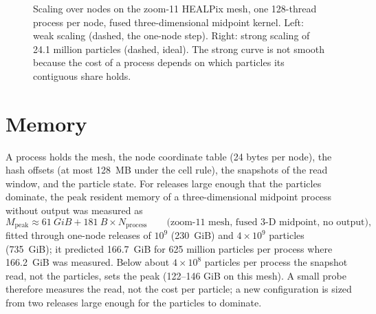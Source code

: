 \begin{figure}[t]
\centering
{}
\caption{Scaling over nodes on the zoom-11 HEALPix mesh, one 128-thread process per node, fused
three-dimensional midpoint kernel. Left: weak scaling (dashed, the one-node step). Right: strong
scaling of 24.1 million particles (dashed, ideal). The strong curve is not smooth because the cost of
a process depends on which particles its contiguous share holds.}
\label{fig:perf-nodes}
\end{figure}

\section{Memory}\label{sec:perf-memory}

A process holds the mesh, the node coordinate table (24 bytes per node), the hash offsets (at most
\SI{128}{MB} under the cell rule), the snapshots of the read window, and the particle state. For
releases large enough that the particles dominate, the peak resident memory of a
three-dimensional midpoint process without output was measured as
\begin{equation}\label{eq:perf-memory}
  M_{\text{peak}} \approx \SI{61}{GiB} + \SI{181}{B} \times N_{\text{process}}
  \qquad\text{(zoom-11 mesh, fused 3-D midpoint, no output)},
\end{equation}
fitted through one-node releases of $10^{9}$ (\SI{230}{GiB}) and $4\times10^{9}$ particles
(\SI{735}{GiB}); it predicted \SI{166.7}{GiB} for 625 million particles per process where
\SI{166.2}{GiB} was measured. Below about $4\times10^{8}$ particles per process the snapshot read,
not the particles, sets the peak (122--146 GiB on this mesh). A small probe therefore measures the
read, not the cost per particle; a new configuration is sized from two releases large enough for the
particles to dominate.

